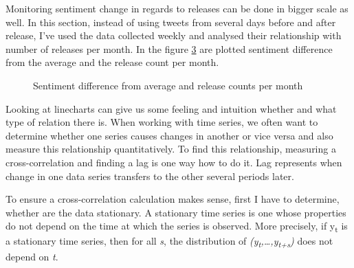 Monitoring sentiment change in regards to releases can be done in bigger scale as well. In this section, instead of using tweets from several days before and after release, I've used the data collected weekly and analysed their relationship with number of releases per month. In the figure \ref{fig:ReleasesSentiment3} are plotted sentiment difference from the average and the release count per month.

\begin{figure}[H]%
    \centering
    \qquad
    \label{fig:ReleasesSentiment1}%
\end{figure}


\begin{figure}[H]%
    \centering
    \qquad
    \label{fig:ReleasesSentiment2}%
\end{figure}


\begin{figure}[H]%
    \centering
    \qquad
        \caption{Sentiment difference from average and release counts per month}
    \label{fig:ReleasesSentiment3}%
\end{figure}

Looking at linecharts can give us some feeling and intuition whether and what type of relation there is. When working with time series, we often want to determine whether one series causes changes in another or vice versa and also measure this relationship quantitatively. To find this relationship, measuring a cross-correlation and finding a lag is one way how to do it. Lag represents when change in one data series transfers to the other several periods later. 

To ensure a cross-correlation calculation makes sense, first I have to determine, whether are the data stationary. A stationary time series is one whose properties do not depend on the time at which the series is observed\cite{hyndman5forecast}. More precisely, if y\textsubscript{t} is a stationary time series, then for all \textit{s}, the distribution of \textit{(y\textsubscript{t},…,y\textsubscript{t+s})} does not depend on \textit{t}.

